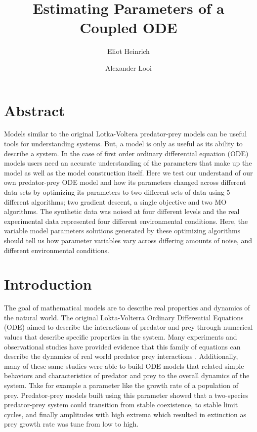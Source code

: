 \documentclass[twocolumn, 9pt]{article}
\begin{document}
\title{Estimating Parameters of a Coupled ODE}

\author[1]{Eliot Heinrich}
\author[2]{Alexander Looi} 

\twocolumn
\maketitle
\section*{Abstract}
\indent{} Models similar to the original Lotka-Voltera predator-prey models can be useful tools for understanding systems. But, a model is only as useful as its ability to describe a system. In the case of first order ordinary differential equation (ODE) models users need an accurate understanding of the parameters that make up the model as well as the model construction itself. Here we test our understand of our own predator-prey ODE model and how its parameters changed across different data sets by optimizing its parameters to two different sets of data using 5 different algorithms; two gradient descent, a single objective and two MO algorithms. The synthetic data was noised at four different levels and the real experimental data represented four different environmental conditions. Here, the variable model parameters solutions generated by these optimizing algorithms should tell us how parameter variables vary across differing amounts of noise, and different environmental conditions.
\section{Introduction} 
\indent{} The goal of mathematical models are to describe real properties and dynamics of the natural world. The original Lokta-Volterra Ordinary Differential Equations (ODE) aimed to describe the interactions of predator and prey through numerical values that describe specific properties in the system. Many experiments and observational studies have provided evidence that this family of equations can describe the dynamics of real world predator prey interactions \cite{fussmann_crossing_2000, yoshida_rapid_2003, huffaker_experimental_1958, utida_cyclic_1957}. Additionally, many of these same studies were able to build ODE models that related simple behaviors and characteristics of predator and prey to the overall dynamics of the system. Take for example a parameter like the growth rate of a population of prey. Predator-prey models built using this parameter showed that a two-species predator-prey system could transition from stable coexistence, to stable limit cycles, and finally amplitudes with high extrema which resulted in extinction as prey growth rate was tune from low to high. \\
\end{document}
